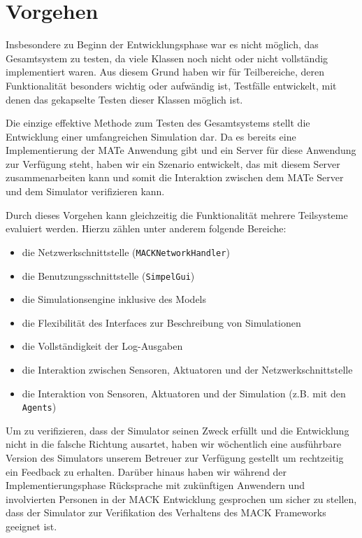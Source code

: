 \section{Vorgehen}\label{sec:eva_approach}
Insbesondere zu Beginn der Entwicklungsphase war es nicht möglich, das Gesamtsystem zu testen, da viele Klassen noch nicht oder nicht vollständig implementiert waren. Aus diesem Grund haben wir für Teilbereiche, deren Funktionalität besonders wichtig oder aufwändig ist, Testfälle entwickelt, mit denen das gekapselte Testen dieser Klassen möglich ist.

Die einzige effektive Methode zum Testen des Gesamtsystems stellt die Entwicklung einer umfangreichen Simulation dar. Da es bereits eine Implementierung der MATe Anwendung gibt und ein Server für diese Anwendung zur Verfügung steht, haben wir ein Szenario entwickelt, das mit diesem Server zusammenarbeiten kann und somit die Interaktion zwischen dem MATe Server und dem Simulator verifizieren kann.

Durch dieses Vorgehen kann gleichzeitig die Funktionalität mehrere Teilsysteme evaluiert werden. Hierzu zählen unter anderem folgende Bereiche:
\begin{itemize}
	\item die Netzwerkschnittstelle (\texttt{MACKNetworkHandler})
	\item die Benutzungsschnittstelle (\texttt{SimpelGui})
	\item die Simulationsengine inklusive des Models
	\item die Flexibilität des Interfaces zur Beschreibung von Simulationen
	\item die Vollständigkeit der Log-Ausgaben
	\item die Interaktion zwischen Sensoren, Aktuatoren und der Netzwerkschnittstelle
	\item die Interaktion von Sensoren, Aktuatoren und der Simulation (z.B. mit den \texttt{Agents})
\end{itemize}

Um zu verifizieren, dass der Simulator seinen Zweck erfüllt und die Entwicklung nicht in die falsche Richtung ausartet, haben wir wöchentlich eine ausführbare Version des Simulators unserem Betreuer zur Verfügung gestellt um rechtzeitig ein Feedback zu erhalten. Darüber hinaus haben wir während der Implementierungsphase Rücksprache mit zukünftigen Anwendern und involvierten Personen  in der MACK Entwicklung gesprochen um sicher zu stellen, dass der Simulator zur Verifikation des Verhaltens des MACK Frameworks geeignet ist.

